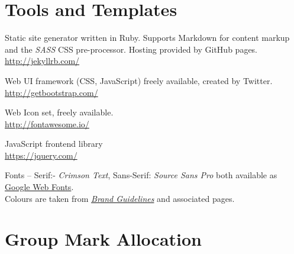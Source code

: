 \documentclass[a4paper, notoc]{tufte-handout}
\let\origdescription\description
\renewenvironment{description}{
  \setlength{\leftmargini}{1.5em}
  \origdescription
  \setlength{\itemindent}{-1.5em}
  \setlength{\labelsep}{\textwidth}
}
{\endlist}
\begin{document}
\section{Tools and Templates}


\begin{description}

\item[Jekyll]
Static site generator written in Ruby. Supports Markdown for 
content markup and the \textit{SASS} CSS pre-processor.
Hosting provided by GitHub pages.
\\
\href{http://jekyllrb.com/}{http://jekyllrb.com/}

\item[BootStrap]
Web UI framework (CSS, JavaScript) freely available, created by Twitter.
\\
\href{http://getbootstrap.com/}{http://getbootstrap.com/}

\item[FontAwesome]
Web Icon set, freely available.
\\
\href{http://fontawesome.io/}{http://fontawesome.io/}


\item[JQuery]
JavaScript frontend library
\\
\href{https://jquery.com/}{https://jquery.com/}

\item[University of Edinburgh Style Guide]
Fonts -- Serif:- \textit{Crimson Text}, Sans-Serif: \textit{Source Sans Pro} both 
available as \href{https://fonts.google.com/}{Google Web Fonts}.
\\
Colours are taken from 
\href{http://www.ed.ac.uk/communications-marketing/resources}{\textit{Brand Guidelines}} 
and associated pages.
\\



\end{description}


\section*{Group Mark Allocation}\label{group-mark-allocation}

\end{document}
